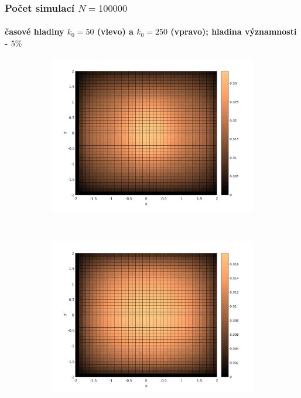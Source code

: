 \begin{frame}\frametitle{Počet simulací $N=100000$}
\framesubtitle{časové hladiny $k_{0}=50$ (vlevo) a $k_{0}=250$ (vpravo); hladina významnosti - $5 \%$}
\begin{figure}
    \centering
    \begin{subfigure}[t]{0.5\textwidth}
        \centering
        \includegraphics[width=1\linewidth]{../../results/simulations/100000/solutionErr/solutionError_sim100000_step01_time50_boundary2.pdf}
    \end{subfigure}%
    ~ 
    \begin{subfigure}[t]{0.5\textwidth}
        \centering
        \includegraphics[width=1\linewidth]{../../results/simulations/100000/solutionErr/solutionError_sim100000_step01_time250_boundary2.pdf}
    \end{subfigure}
\end{figure}
\end{frame}

